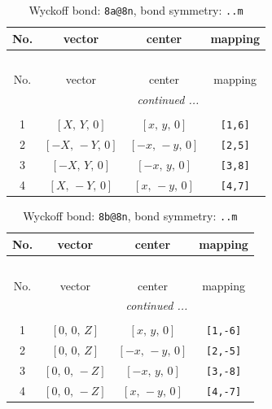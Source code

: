 \documentclass[fleqn,8pt]{jsarticle}
\begin{document}
\begin{longtable}{cccc}
\caption{Wyckoff bond: {\tt 8a@8n}, bond symmetry: {\tt ..m}}
 \\
 \hline \hline
No. & vector & center & mapping \\ \hline \endfirsthead

\multicolumn{3}{l}{\tablename\ \thetable{}} \\
 \hline \hline
No. & vector & center & mapping \\ \hline \endhead

 \hline \hline
\multicolumn{3}{r}{\footnotesize\it continued ...} \\ \endfoot

 \hline \hline
\multicolumn{3}{r}{} \\ \endlastfoot

1 & $\left[ X,\, Y,\, 0 \right]$ & $\left[ x,\, y,\, 0 \right]$ & {\tt [1,6]} \\ \hline
2 & $\left[ - X,\, - Y,\, 0 \right]$ & $\left[ - x,\, - y,\, 0 \right]$ & {\tt [2,5]} \\ \hline
3 & $\left[ - X,\, Y,\, 0 \right]$ & $\left[ - x,\, y,\, 0 \right]$ & {\tt [3,8]} \\ \hline
4 & $\left[ X,\, - Y,\, 0 \right]$ & $\left[ x,\, - y,\, 0 \right]$ & {\tt [4,7]} \\
\end{longtable}
\renewcommand{\arraystretch}{1.2}
\begin{longtable}{cccc}
\caption{Wyckoff bond: {\tt 8b@8n}, bond symmetry: {\tt ..m}}
 \\
 \hline \hline
No. & vector & center & mapping \\ \hline \endfirsthead

\multicolumn{3}{l}{\tablename\ \thetable{}} \\
 \hline \hline
No. & vector & center & mapping \\ \hline \endhead

 \hline \hline
\multicolumn{3}{r}{\footnotesize\it continued ...} \\ \endfoot

 \hline \hline
\multicolumn{3}{r}{} \\ \endlastfoot

1 & $\left[ 0,\, 0,\, Z \right]$ & $\left[ x,\, y,\, 0 \right]$ & {\tt [1,-6]} \\ \hline
2 & $\left[ 0,\, 0,\, Z \right]$ & $\left[ - x,\, - y,\, 0 \right]$ & {\tt [2,-5]} \\ \hline
3 & $\left[ 0,\, 0,\, - Z \right]$ & $\left[ - x,\, y,\, 0 \right]$ & {\tt [3,-8]} \\ \hline
4 & $\left[ 0,\, 0,\, - Z \right]$ & $\left[ x,\, - y,\, 0 \right]$ & {\tt [4,-7]} \\
\end{longtable}
\end{document}
